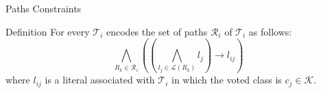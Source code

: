 \begin{frame}{Paths Constraints}
    \begin{block}{Definition}
        For every $\mathcal{T}_{i}$ encodes the set of paths $\mathcal{R}_{i}$ of $\mathcal{T}_{i}$ as follows:
        \begin{equation*}
        \bigwedge_{R_{k} \in \mathcal{R}_{i}} \left( \left( \bigwedge_{l_{j} \in \mathcal{L}(R_{k})} l_{j} \right) \rightarrow l_{ij} \right)
        \end{equation*}
        where $l_{ij}$ is a literal associated with $\mathcal{T}_{i}$ in which the voted class is $c_{j} \in \mathcal{K}$.
    \end{block}
\end{frame}
